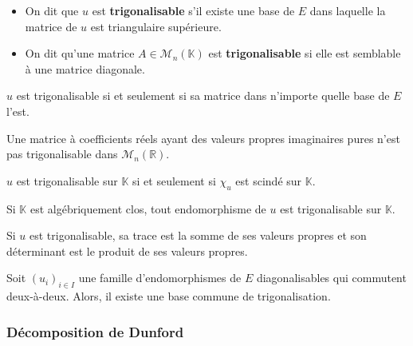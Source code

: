 
  \begin{definition}
    \begin{itemize}
      \item On dit que $u$ est \textbf{trigonalisable} s'il existe une base de $E$ dans laquelle la matrice de $u$ est triangulaire supérieure.
      \item On dit qu'une matrice $A \in \mathcal{M}_n(\mathbb{K})$ est \textbf{trigonalisable} si elle est semblable à une matrice diagonale.
    \end{itemize}
  \end{definition}

  \begin{remark}
    $u$ est trigonalisable si et seulement si sa matrice dans n'importe quelle base de $E$ l'est.
  \end{remark}

  \begin{example}
    Une matrice à coefficients réels ayant des valeurs propres imaginaires pures n'est pas trigonalisable dans $\mathcal{M}_n(\mathbb{R})$.
  \end{example}

  \begin{theorem}
    $u$ est trigonalisable sur $\mathbb{K}$ si et seulement si $\chi_u$ est scindé sur $\mathbb{K}$.
  \end{theorem}

  \begin{corollary}
    Si $\mathbb{K}$ est algébriquement clos, tout endomorphisme de $u$ est trigonalisable sur $\mathbb{K}$.
  \end{corollary}

  \begin{proposition}
    Si $u$ est trigonalisable, sa trace est la somme de ses valeurs propres et son déterminant est le produit de ses valeurs propres.
  \end{proposition}

  \begin{theorem}
    Soit $(u_i)_{i \in I}$ une famille d'endomorphismes de $E$ diagonalisables qui commutent deux-à-deux. Alors, il existe une base commune de trigonalisation.
  \end{theorem}

  \subsubsection{Décomposition de Dunford}

